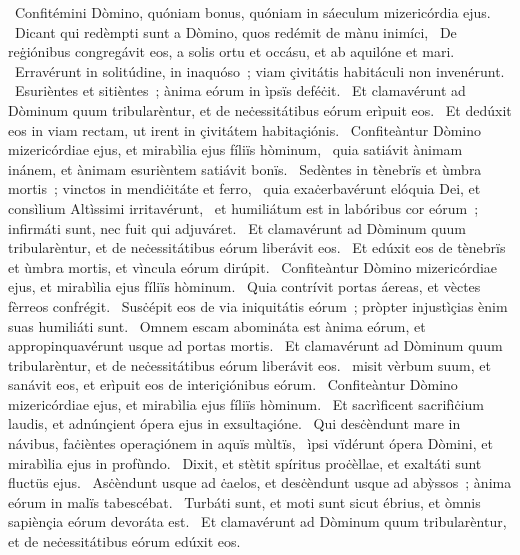 \psalmChapterWithInscription{}
{ }
{%
~Confitémini Dòmino, quóniam bonus, quóniam in sáeculum mizericórdia ejus. 
~Dicant qui redèmpti sunt a Dòmino, quos redémit de mànu inimíci, 
~De reġiónibus congregávit eos, a solis ortu et occásu, et ab aquilóne et mari. 
~Erravérunt in solitúdine, in inaquóso~; viam çivitátis habitáculi non invenérunt. 
~Esurièntes et sitièntes~; ànima eórum in ìpsïs deféċit. 
~Et clamavérunt ad Dòminum quum tribularèntur, et de neċessitátibus eórum erìpuit eos. 
~Et dedúxit eos in viam rectam, ut irent in çivitátem habitaçiónis. 
~Confiteàntur Dòmino mizericórdiae ejus, et mirabìlia ejus fíliïs hòminum, 
~quia satiávit ànimam inánem, et ànimam esurièntem satiávit bonïs. 
~Sedèntes in tènebrïs et ùmbra mortis~; vinctos in mendiċitáte et ferro, 
~quia exaċerbavérunt elóquia Dei, et consìlium Altìssimi irritavérunt, 
~et humiliátum est in labóribus cor eórum~; infirmáti sunt, nec fuit qui adjuváret. 
~Et clamavérunt ad Dòminum quum tribularèntur, et de neċessitátibus eórum liberávit eos. 
~Et edúxit eos de tènebrïs et ùmbra mortis, et vìncula eórum dirúpit. 
~Confiteàntur Dòmino mizericórdiae ejus, et mirabìlia ejus fíliïs hòminum. 
~Quia contrívit portas áereas, et vèctes fèrreos confrégit. 
~Susċépit eos de via iniquitátis eórum~; pròpter injustìçias ènim suas humiliáti sunt. 
~Omnem escam abomináta est ànima eórum, et appropinquavérunt usque ad portas mortis. 
~Et clamavérunt ad Dòminum quum tribularèntur, et de neċessitátibus eórum liberávit eos. 
~misit vèrbum suum, et sanávit eos, et erìpuit eos de interiçiónibus eórum. 
~Confiteàntur Dòmino mizericórdiae ejus, et mirabìlia ejus fíliïs hòminum. 
~Et sacrìficent sacrifìċium laudis, et adnúnçient ópera ejus in exsultaçióne. 
~Qui desċèndunt mare in návibus, faċièntes operaçiónem in aquïs mùltïs, 
~ìpsi vïdérunt ópera Dòmini, et mirabìlia ejus in profùndo. 
~Dixit, et stètit spíritus proċèllae, et exaltáti sunt fluctüs ejus. 
~Asċèndunt usque ad ċaelos, et desċèndunt usque ad abỳssos~; ànima eórum in malïs tabescébat. 
~Turbáti sunt, et moti sunt sicut ébrius, et òmnis sapiènçia eórum devoráta est. 
~Et clamavérunt ad Dòminum quum tribularèntur, et de neċessitátibus eórum edúxit eos. 
}
